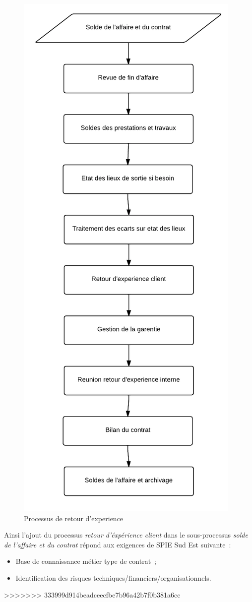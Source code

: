 \begin{figure}[h!]
	\centering
	\includegraphics[width=0.45\linewidth]{images/processus_retour_experience.png}
	\caption{Processus de retour d'experience}
	\label{fig:processusRetourExperience}
\end{figure}

Ainsi l'ajout du processus \textit{retour d'\'exp\'erience client} dans le sous-processus \textit{solde
de l'affaire et du contrat} r\'epond aux exigences de SPIE Sud Est suivante~:

\begin{itemize}
    \item Base de connaissance m\'etier type de contrat~;
    \item Identification des risques techniques/financiers/organisationnels.
\end{itemize}


>>>>>>> 333999d914beadceecfbe7b96a42b7f0b381a6cc
